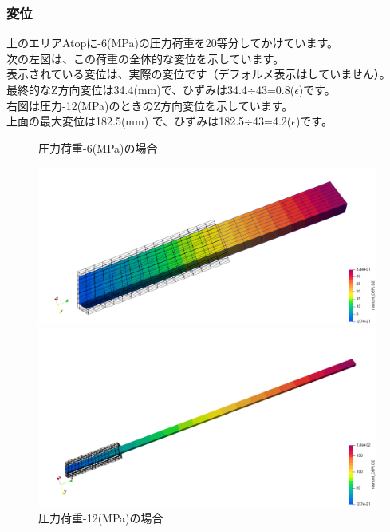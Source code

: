 \subsubsection{変位}
上のエリアAtopに-6(MPa)の圧力荷重を20等分してかけています。\\
次の左図は、この荷重の全体的な変位を示しています。\\表示されている変位は、実際の変位です（デフォルメ表示はしていません）。\\
最終的なZ方向変位は34.4(mm)で、ひずみは34.4÷43=0.8($\epsilon$)です。\\
右図は圧力-12(MPa)のときのZ方向変位を示しています。\\
上面の最大変位は182.5(mm) で、ひずみは182.5÷43=4.2($\epsilon$)です。
\begin{figure}[H]
	\begin{minipage}{0.48\hsize}
		\caption{圧力荷重-6(MPa)の場合}
		\centering
		\includegraphics[width=0.9\columnwidth]{fig/6MPa.png}
	\end{minipage}
	\begin{minipage}{0.48\hsize}
		\caption{圧力荷重-12(MPa)の場合}
		\centering
		\includegraphics[width=0.9\columnwidth]{fig/12MPa.png}
	\end{minipage}
\end{figure}
\clearpage
